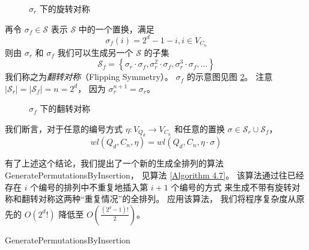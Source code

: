 \begin{figure}[h!]
	\centering
	
	\caption{$\sigma_r$ 下的旋转对称}
	\label{Figure 4-1}
\end{figure}

再令 $\sigma_f \in \mathcal{S}$ 表示 $\mathcal{S}$ 中的一个置换，满足
\begin{equation}
\sigma_f(i) = 2^d - 1 - i, i \in V_{C_n}
\end{equation}
则由 $\sigma_r$ 和 $\sigma_f$ 我们可以生成另一个 $\mathcal{S}$ 的子集
\begin{equation}
\mathcal{S}_f = \left\{\sigma_r \cdot \sigma_f, \sigma_r^2 \cdot \sigma_f, \sigma_r^3 \cdot \sigma_f, \dots\right\}
\end{equation}
我们称之为\emph{翻转对称}（Flipping Symmetry）。
$\sigma_f$ 的示意图见图 \ref{Figure 4-2}。
注意 $|\mathcal{S}_r| = |\mathcal{S}_f| = n = 2^d$，
因为 $\sigma_r^{n + 1} = \sigma_r$。

\begin{figure}[h!]
	\centering
	
	\caption{$\sigma_f$ 下的翻转对称}
	\label{Figure 4-2}
\end{figure}

我们断言，对于任意的编号方式 $\eta \colon V_{Q_d} \rightarrow V_{C_n}$
和任意的置换 $\sigma \in \mathcal{S}_r \cup \mathcal{S}_f$，
\begin{equation}
wl(Q_d, C_n, \eta) = wl(Q_d, C_n, \eta \cdot \sigma)
\end{equation}

有了上述这个结论，我们提出了一个新的生成全排列的算法 GeneratePermutationsByInsertion，
见算法 \ref{Algorithm 4.7}。
该算法通过往已经存在 $i$ 个编号的排列中不重复地插入第 $i + 1$ 个编号的方式
来生成不带有旋转对称和翻转对称这两种“重复情况”的全排列。
应用该算法，
我们将程序复杂度从原先的 $O\left(2^d !\right)$ 降低至 $O\left(\frac{(2^d - 1)!}{2}\right)$。

\begin{algorithm}[h!]
\caption{GeneratePermutationsByInsertion}
\label{Algorithm 4.7}
\begin{algorithmic}[1]
	 
	 

		 
	\Else
			 
				 
			\EndIf
		\EndFor
	\EndIf
\end{algorithmic}
\end{algorithm}

